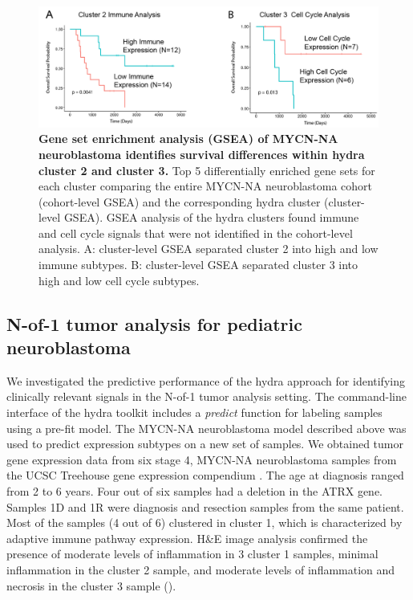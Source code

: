 \documentclass[10pt,letterpaper]{article}
\begin{document}
\begin{figure}[!h]
	\includegraphics[width=\textwidth]{img/PNG/SubCluster-Survival-V1-2x}
	\caption{{\bf Gene set enrichment analysis (GSEA) of MYCN-NA neuroblastoma identifies survival differences within hydra cluster 2 and cluster 3.}
		Top 5 differentially enriched gene sets for each cluster comparing the entire MYCN-NA neuroblastoma cohort (cohort-level GSEA) and the corresponding hydra cluster (cluster-level GSEA). GSEA analysis of the hydra clusters found immune and cell cycle signals that were not identified in the cohort-level analysis. A: cluster-level GSEA separated cluster 2 into high and low immune subtypes. B: cluster-level GSEA separated cluster 3 into high and low cell cycle subtypes.}
	\label{subcluster}
\end{figure}

\subsection*{N-of-1 tumor analysis for pediatric neuroblastoma}
We investigated the predictive performance of the hydra approach for identifying clinically relevant signals in the N-of-1 tumor analysis setting. The command-line interface of the hydra toolkit includes a \textit{predict} function for labeling samples using a pre-fit model. The MYCN-NA neuroblastoma model described above was used to predict expression subtypes on a new set of samples. We obtained tumor gene expression data from six stage 4, MYCN-NA neuroblastoma samples from the UCSC Treehouse gene expression compendium \cite{newtonTumorMapExploringMolecular2017, vaskeComparativeTumorRNA2019}. The age at diagnosis ranged from 2 to 6 years. Four out of six samples had a deletion in the ATRX gene. Samples 1D and 1R were diagnosis and resection samples from the same patient. Most of the samples (4 out of 6) clustered in cluster 1, which is characterized by adaptive immune pathway expression. H\&E image analysis confirmed the presence of moderate levels of inflammation in 3 cluster 1 samples, minimal inflammation in the cluster 2 sample, and moderate levels of inflammation and necrosis in the cluster 3 sample ().
\end{document}
